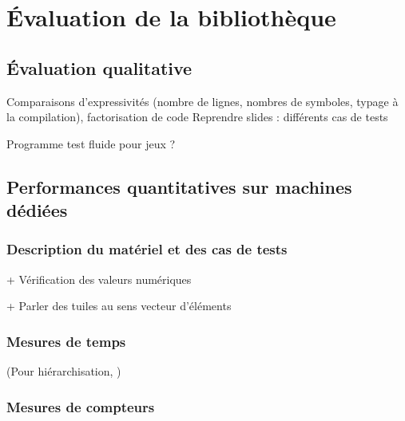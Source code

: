 
\chapter{\'Evaluation de la bibliothèque}


\section{\'Evaluation qualitative}

Comparaisons d'expressivités (nombre de lignes, nombres de symboles, typage à la compilation), factorisation de code
Reprendre slides : différents cas de tests

Programme test fluide pour jeux \cite{Art15} ?


\section{Performances quantitatives sur machines dédiées}

\subsection{Description du matériel et des cas de tests}
\label{sec:desc_mat_tests}



+ Vérification des valeurs numériques

+ Parler des tuiles au sens vecteur d'éléments

\subsection{Mesures de temps}

(Pour hiérarchisation, \cite{Ths3,Ths4})


\subsection{Mesures de compteurs}

